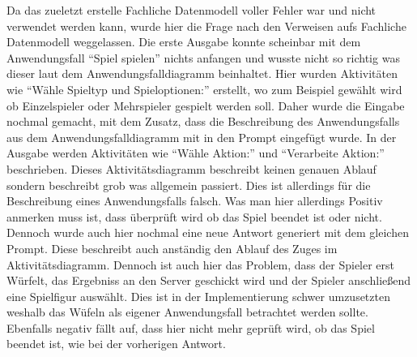Da das zueletzt erstelle Fachliche Datenmodell voller Fehler war und nicht verwendet werden kann, wurde hier die Frage nach den Verweisen aufs Fachliche Datenmodell 
weggelassen. Die erste Ausgabe konnte scheinbar mit dem Anwendungsfall ``Spiel spielen'' nichts anfangen und wusste nicht so richtig was dieser laut dem 
Anwendungsfalldiagramm beinhaltet. Hier wurden Aktivitäten wie ``Wähle Spieltyp und Spieloptionen:'' erstellt, wo zum Beispiel gewählt wird ob Einzelspieler 
oder Mehrspieler gespielt werden soll. Daher wurde die Eingabe nochmal gemacht, mit dem Zusatz, dass die Beschreibung des Anwendungsfalls aus dem Anwendungsfalldiagramm
mit in den Prompt eingefügt wurde. In der Ausgabe werden Aktivitäten wie ``Wähle Aktion:'' und ``Verarbeite Aktion:'' beschrieben. Dieses Aktivitätsdiagramm beschreibt 
keinen genauen Ablauf sondern beschreibt grob was allgemein passiert. Dies ist allerdings für die Beschreibung eines Anwendungsfalls falsch. Was man hier allerdings Positiv
anmerken muss ist, dass überprüft wird ob das Spiel beendet ist oder nicht. Dennoch wurde auch hier nochmal eine neue Antwort generiert mit dem gleichen Prompt. Diese 
beschreibt auch anständig den Ablauf des Zuges im Aktivitätsdiagramm. Dennoch ist auch hier das Problem, dass der Spieler erst Würfelt, das Ergebniss an den Server geschickt 
wird und der Spieler anschließend eine Spielfigur auswählt. Dies ist in der Implementierung schwer umzusetzten weshalb das Wüfeln als eigener Anwendungsfall betrachtet werden 
sollte. Ebenfalls negativ fällt auf, dass hier nicht mehr geprüft wird, ob das Spiel beendet ist, wie bei der vorherigen Antwort.\\

